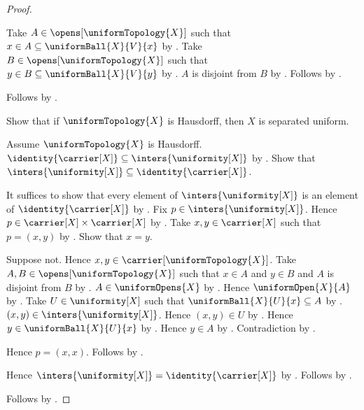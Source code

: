 \begin{proof}
\begin{subproof}
\begin{subproof}
            Take $A\in\opens[\uniformTopology{X}]$ such that
                $x\in A\subseteq\uniformBall{X}{V}{x}$
                by .
            Take $B\in\opens[\uniformTopology{X}]$ such that
                $y\in B\subseteq\uniformBall{X}{V}{y}$
                by .
            $A$ is disjoint from $B$ by .
            Follows by \auto.
        \end{subproof}
        Follows by .
    \end{subproof}

    Show that if $\uniformTopology{X}$ is Hausdorff, then
        $X$ is separated uniform.
    \begin{subproof}
        Assume $\uniformTopology{X}$ is Hausdorff.
        $\identity{\carrier[X]}\subseteq\inters{\uniformity[X]}$
            by .
        Show that $\inters{\uniformity[X]}
            \subseteq\identity{\carrier[X]}$.
        \begin{subproof}
            It suffices to show that every element of
                $\inters{\uniformity[X]}$ is an element of
                $\identity{\carrier[X]}$ by .
            Fix $p\in\inters{\uniformity[X]}$.
            Hence $p\in\carrier[X]\times\carrier[X]$
                by .
            Take $x,y\in\carrier[X]$ such that $p=(x,y)$
                by .
            Show that $x=y$.
            \begin{subproof}
                Suppose not.
                Hence $x,y\in\carrier[\uniformTopology{X}]$.
                Take $A,B\in\opens[\uniformTopology{X}]$ such that
                    $x\in A$ and $y\in B$ and $A$ is disjoint from $B$
                    by .
                $A\in\uniformOpens{X}$ by .
                Hence $\uniformOpen{X}{A}$ by .
                Take $U\in\uniformity[X]$ such that
                    $\uniformBall{X}{U}{x}\subseteq A$
                    by .
                $(x,y)\in\inters{\uniformity[X]}$.
                Hence $(x,y)\in U$ by .
                Hence $y\in\uniformBall{X}{U}{x}$
                    by .
                Hence $y\in A$ by .
                Contradiction by .
            \end{subproof}
            Hence $p=(x,x)$.
            Follows by .
        \end{subproof}
        Hence $\inters{\uniformity[X]}=\identity{\carrier[X]}$
            by .
        Follows by .
    \end{subproof}
    Follows by \auto.
\end{proof}
